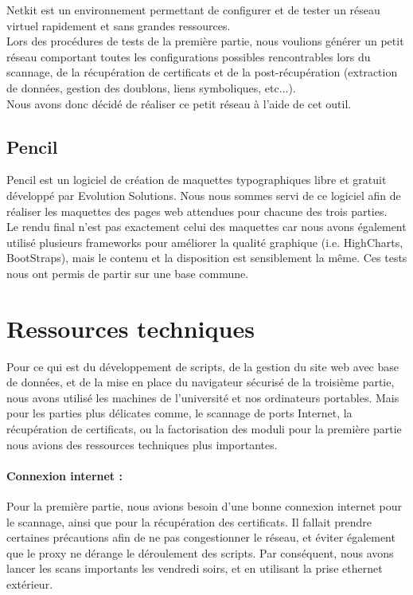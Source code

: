 Netkit est un environnement permettant de configurer et de tester un réseau virtuel rapidement et sans grandes ressources.\\
Lors des procédures de tests de la première partie, nous voulions générer un petit réseau comportant toutes les configurations possibles rencontrables lors du scannage, de la récupération de certificats et de la post-récupération (extraction de données, gestion des doublons, liens symboliques, etc...).\\
Nous avons donc décidé de réaliser ce petit réseau à l'aide de cet outil.

\subsection{Pencil}

Pencil \cite{pencil} est un logiciel de création de maquettes typographiques libre et gratuit développé par Evolution Solutions.
Nous nous sommes servi de ce logiciel afin de réaliser les maquettes des pages web attendues pour chacune des trois parties.\\
Le rendu final n'est pas exactement celui des maquettes car nous avons également utilisé plusieurs frameworks pour améliorer la qualité graphique (i.e. HighCharts, BootStraps), mais le contenu et la disposition est sensiblement la même.
Ces tests nous ont permis de partir sur une base commune.

\section{Ressources techniques}

Pour ce qui est du développement de scripts, de la gestion du site web avec base de données, et de la mise en place du navigateur sécurisé de la troisième partie, nous avons utilisé les machines de l'université et nos ordinateurs portables. Mais pour les parties plus délicates comme, le scannage de ports Internet, la récupération de certificats, ou la factorisation des moduli pour la première partie nous avions des ressources techniques plus importantes.

\paragraph{Connexion internet : } Pour la première partie, nous avions besoin d'une bonne connexion internet pour le scannage, ainsi que pour la récupération des certificats. Il fallait prendre certaines précautions afin de ne pas congestionner le réseau, et éviter également que le proxy ne dérange le déroulement des scripts. Par conséquent, nous avons lancer les scans importants les vendredi soirs, et en utilisant la prise ethernet extérieur.

